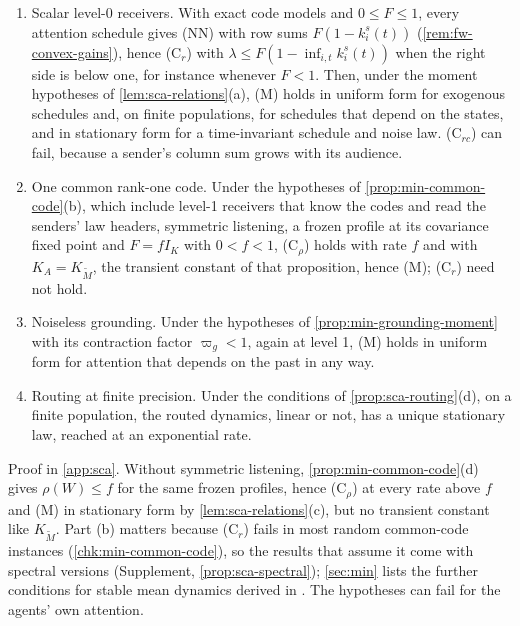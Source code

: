 \begin{proposition}\label{prop:sca-sufficient}
\begin{enumerate}
\item[(a)] Scalar level-0 receivers. With exact code models and $0\le F\le1$, every attention schedule gives \textup{(NN)} with row sums $F(1-k^s_i(t))$ (\cref{rem:fw-convex-gains}), hence \textup{(C$_r$)} with $\lambda\le F(1-\inf_{i,t}k^s_i(t))$ when the right side is below one, for instance whenever $F<1$. Then, under the moment hypotheses of \cref{lem:sca-relations}(a), \textup{(M)} holds in uniform form for exogenous schedules and, on finite populations, for schedules that depend on the states, and in stationary form for a time-invariant schedule and noise law. \textup{(C$_{rc}$)} can fail, because a sender's column sum grows with its audience.
\item[(b)] One common rank-one code. Under the hypotheses of \cref{prop:min-common-code}(b), which include level-1 receivers that know the codes and read the senders' law headers, symmetric listening, a frozen profile at its covariance fixed point and $F=fI_K$ with $0<f<1$, \textup{(C$_\rho$)} holds with rate $f$ and with $K_A=K_{\tilde M}$, the transient constant of that proposition, hence \textup{(M)}; \textup{(C$_r$)} need not hold.
\item[(c)] Noiseless grounding. Under the hypotheses of \cref{prop:min-grounding-moment} with its contraction factor $\varpi_g<1$, again at level 1, \textup{(M)} holds in uniform form for attention that depends on the past in any way.
\item[(d)] Routing at finite precision. Under the conditions of \cref{prop:sca-routing}(d), on a finite population, the routed dynamics, linear or not, has a unique stationary law, reached at an exponential rate.
\end{enumerate}
\end{proposition}
Proof in \cref{app:sca}. Without symmetric listening, \cref{prop:min-common-code}(d) gives $\rho(W)\le f$ for the same frozen profiles, hence \textup{(C$_\rho$)} at every rate above $f$ and \textup{(M)} in stationary form by \cref{lem:sca-relations}(c), but no transient constant like $K_{\tilde M}$. Part (b) matters because \textup{(C$_r$)} fails in most random common-code instances (\cref{chk:min-common-code}), so the results that assume it come with spectral versions (Supplement, \cref{prop:sca-spectral}); \cref{sec:min} lists the further conditions for stable mean dynamics derived in \citet{dennis2026communicating}. The hypotheses can fail for the agents' own attention.

